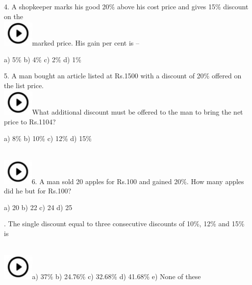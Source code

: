 \documentclass{article} %
\begin{document}
\noindent 

4.   A shopkeeper marks his good 20\% above his cost price and gives 15\% discount on the  
\noindent \\ \includegraphics*[width=0.60in, height=0.52in]{images/image1}marked price. His gain per cent is --

\noindent a) 5\%                      b) 4\%                c) 2\%                d) 1\%

\noindent 

\noindent 

5.   A man bought an article listed at Rs.1500 with a discount of 20\% offered on the list price.  
\noindent \\ \includegraphics*[width=0.60in, height=0.52in]{images/image1}What additional discount must be offered to the man to bring the net price to Rs.1104?

\noindent a) 8\%                      b) 10\%              c) 12\%              d) 15\%

\noindent 

\noindent 

\noindent  
\noindent \\ \includegraphics*[width=0.59in, height=0.52in]{images/image1}6.   A man sold 20 apples for Rs.100 and gained 20\%. How many apples did he but for Rs.100?

\noindent 

\noindent a) 20                        b) 22                 c) 24                  d) 25

\noindent 

.   The single discount equal to three consecutive discounts of 10\%, 12\% and 15\% is

\noindent  
\noindent \\ \includegraphics*[width=0.60in, height=0.52in]{images/image1}a) 37\%                    b) 24.76\%         c) 32.68\%         d) 41.68\%        e) None of these
\end{document}

